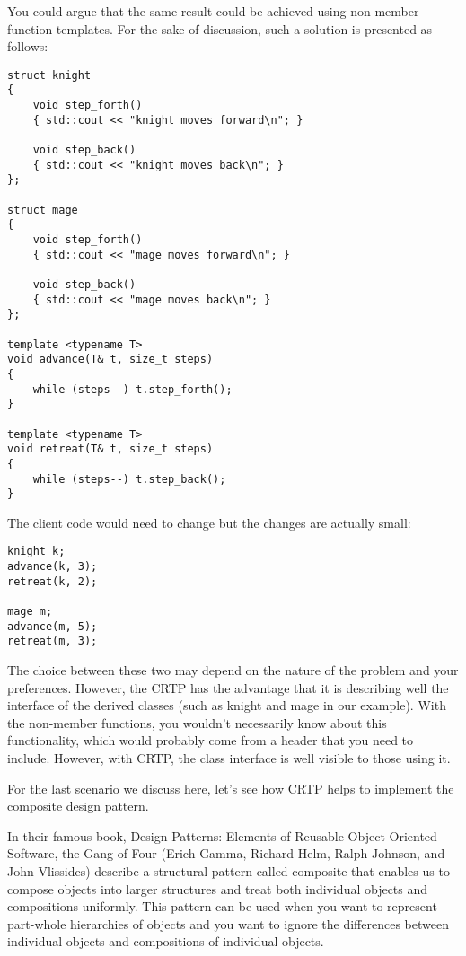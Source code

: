 You could argue that the same result could be achieved using non-member function templates. For the sake of discussion, such a solution is presented as follows:

\begin{lstlisting}[style=styleCXX]
struct knight
{
	void step_forth()
	{ std::cout << "knight moves forward\n"; }
	
	void step_back()
	{ std::cout << "knight moves back\n"; }
};

struct mage
{
	void step_forth()
	{ std::cout << "mage moves forward\n"; }
	
	void step_back()
	{ std::cout << "mage moves back\n"; }
};

template <typename T>
void advance(T& t, size_t steps)
{
	while (steps--) t.step_forth();
}

template <typename T>
void retreat(T& t, size_t steps)
{
	while (steps--) t.step_back();
}
\end{lstlisting}

The client code would need to change but the changes are actually small:

\begin{lstlisting}[style=styleCXX]
knight k;
advance(k, 3);
retreat(k, 2);

mage m;
advance(m, 5);
retreat(m, 3);
\end{lstlisting}

The choice between these two may depend on the nature of the problem and your preferences. However, the CRTP has the advantage that it is describing well the interface of the derived classes (such as knight and mage in our example). With the non-member functions, you wouldn’t necessarily know about this functionality, which would probably come from a header that you need to include. However, with CRTP, the class interface is well visible to those using it.

For the last scenario we discuss here, let’s see how CRTP helps to implement the composite design pattern.


In their famous book, Design Patterns: Elements of Reusable Object-Oriented Software, the Gang of Four (Erich Gamma, Richard Helm, Ralph Johnson, and John Vlissides) describe a structural pattern called composite that enables us to compose objects into larger structures and treat both individual objects and compositions uniformly. This pattern can be used when you want to represent part-whole hierarchies of objects and you want to ignore the differences between individual objects and compositions of individual objects.

